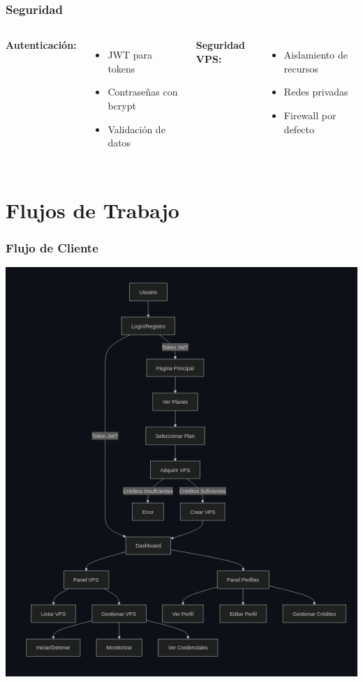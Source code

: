 \documentclass[aspectratio=169]{beamer}
\begin{document}
\begin{frame}
\frametitle{Seguridad}
\begin{columns}
\textbf{Autenticación:}
\begin{itemize}
    \item JWT para tokens
    \item Contraseñas con bcrypt
    \item Validación de datos
\end{itemize}
\textbf{Seguridad VPS:}
\begin{itemize}
    \item Aislamiento de recursos
    \item Redes privadas
    \item Firewall por defecto
\end{itemize}
\end{columns}
\end{frame}

\section{Flujos de Trabajo}

\begin{frame}
\frametitle{Flujo de Cliente}
\centering
\includegraphics[height=0.8\textheight]{img/diagrama_cliente.png}
\end{frame}
\end{document}
